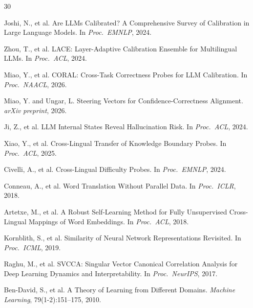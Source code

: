 \documentclass[11pt,a4paper]{article}
\begin{document}
\begin{thebibliography}{30}

Joshi, N., et al.
\newblock Are LLMs Calibrated? A Comprehensive Survey of Calibration in Large Language Models.
\newblock In \emph{Proc.\ EMNLP}, 2024.

Zhou, T., et al.
\newblock LACE: Layer-Adaptive Calibration Ensemble for Multilingual LLMs.
\newblock In \emph{Proc.\ ACL}, 2024.

Miao, Y., et al.
\newblock CORAL: Cross-Task Correctness Probes for LLM Calibration.
\newblock In \emph{Proc.\ NAACL}, 2026.

Miao, Y. and Ungar, L.
\newblock Steering Vectors for Confidence-Correctness Alignment.
\newblock \emph{arXiv preprint}, 2026.

Ji, Z., et al.
\newblock LLM Internal States Reveal Hallucination Risk.
\newblock In \emph{Proc.\ ACL}, 2024.

Xiao, Y., et al.
\newblock Cross-Lingual Transfer of Knowledge Boundary Probes.
\newblock In \emph{Proc.\ ACL}, 2025.

Civelli, A., et al.
\newblock Cross-Lingual Difficulty Probes.
\newblock In \emph{Proc.\ EMNLP}, 2024.

Conneau, A., et al.
\newblock Word Translation Without Parallel Data.
\newblock In \emph{Proc.\ ICLR}, 2018.

Artetxe, M., et al.
\newblock A Robust Self-Learning Method for Fully Unsupervised Cross-Lingual Mappings of Word Embeddings.
\newblock In \emph{Proc.\ ACL}, 2018.

Kornblith, S., et al.
\newblock Similarity of Neural Network Representations Revisited.
\newblock In \emph{Proc.\ ICML}, 2019.

Raghu, M., et al.
\newblock SVCCA: Singular Vector Canonical Correlation Analysis for Deep Learning Dynamics and Interpretability.
\newblock In \emph{Proc.\ NeurIPS}, 2017.

Ben-David, S., et al.
\newblock A Theory of Learning from Different Domains.
\newblock \emph{Machine Learning}, 79(1-2):151--175, 2010.


\end{thebibliography}
\end{document}
